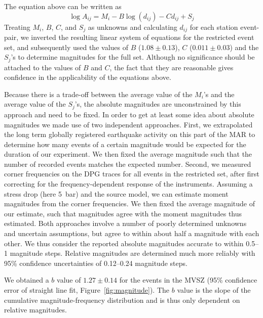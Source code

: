 \documentclass[jgr]{agu2001}
\newlength{\tw}
\begin{document}
\begin{article}
The equation above can be written as 
\begin{equation}
\log A_{ij}= M_i - B \log(d_{ij}) - C d_{ij} + S_{j}
\end{equation}
Treating $M_i$, $B$, $C$, and $S_j$ as unknowns and calculating
$d_{ij}$ for each station event-pair, we inverted the resulting linear
system of equations for the restricted event set, and subsequently
used the values of $B$ ($1.08 \pm 0.13$), $C$ ($0.011\pm0.03$) and the
$S_{j}$'s to determine magnitudes for the full set.   
Although no significance should be attached to the values of $B$ and
$C$, the fact that they are reasonable gives confidence in the
applicability of the equations above.

Because there is a trade-off between the average
value of the $M_i$'s and the average value of the $S_j$'s, the absolute
magnitudes are unconstrained by this approach and need to be fixed.
In order to get at least some idea about absolute magnitudes we made
use of two independent
approaches. First, we extrapolated the long term globally registered earthquake activity on this
part of the MAR to determine how many events of a certain magnitude
would be expected for the duration of our experiment. We then fixed the
average magnitude such that the number of recorded events matches the
expected number.  Second, we measured corner frequencies on the DPG
traces for all
events in the restricted set, after first correcting for the
frequency-dependent response of the instruments. Assuming a stress drop (here 5~bar) and the
\citet{brune70} source model, we can estimate moment
magnitudes from the corner frequencies. We then fixed the average magnitude of our estimate, such
that magnitudes agree with the moment magnitudes thus estimated.
Both approaches involve a number of poorly determined unknowns and
uncertain assumptions, but agree to within about half a magnitude with
each other.  We thus consider the reported absolute magnitudes
accurate to within 0.5--1 magnitude steps.  Relative magnitudes are
determined much more reliably with 95\% confidence uncertainties
of 0.12--0.24 magnitude steps.  

We obtained a $b$ value of  $1.27\pm0.14$ for the events in the MVSZ (95\%
confidence error of straight line fit, Figure~\ref{fig:magnitude}).  
The $b$ value is the slope of
the cumulative magnitude-frequency distribution and is thus only
dependent on relative magnitudes.


\end{article}
\end{document}
